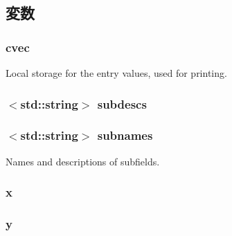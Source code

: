 \subsection{変数}
\hypertarget{classStats_1_1Vector2dInfo_a8cc2f3a565a2e54ab797f717802bc894}{
\subsubsection[{cvec}]{ {\bf cvec}}}
\label{classStats_1_1Vector2dInfo_a8cc2f3a565a2e54ab797f717802bc894}
Local storage for the entry values, used for printing. \hypertarget{classStats_1_1Vector2dInfo_a722488efce925fb896e4111f77731f25}{
\subsubsection[{subdescs}]{$<$std::string$>$ {\bf subdescs}}}
\label{classStats_1_1Vector2dInfo_a722488efce925fb896e4111f77731f25}
\hypertarget{classStats_1_1Vector2dInfo_a3b95ca426d97cab365cc623926fdd294}{
\subsubsection[{subnames}]{$<$std::string$>$ {\bf subnames}}}
\label{classStats_1_1Vector2dInfo_a3b95ca426d97cab365cc623926fdd294}
Names and descriptions of subfields. \hypertarget{classStats_1_1Vector2dInfo_afe813128131dd3b6a82dd08a2f6786b5}{
\subsubsection[{x}]{ {\bf x}}}
\label{classStats_1_1Vector2dInfo_afe813128131dd3b6a82dd08a2f6786b5}
\hypertarget{classStats_1_1Vector2dInfo_a1b61fe296b3ed741d2e46c445c0d0675}{
\subsubsection[{y}]{ {\bf y}}}
